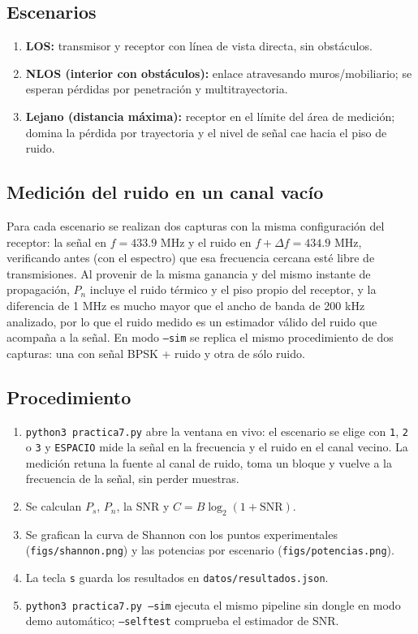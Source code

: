 \documentclass[11pt,a4paper]{article}
\begin{document}
\subsection{Escenarios}

\begin{enumerate}
  \item \textbf{LOS:} transmisor y receptor con línea de vista directa, sin obstáculos.
  \item \textbf{NLOS (interior con obstáculos):} enlace atravesando muros/mobiliario; se esperan pérdidas por penetración y multitrayectoria.
  \item \textbf{Lejano (distancia máxima):} receptor en el límite del área de medición; domina la pérdida por trayectoria y el nivel de señal cae hacia el piso de ruido.
\end{enumerate}

\subsection{Medición del ruido en un canal vacío}

Para cada escenario se realizan dos capturas con la misma configuración del receptor: la señal en $f=433.9$ MHz y el ruido en $f + \Delta f = 434.9$ MHz, verificando antes (con el espectro) que esa frecuencia cercana esté libre de transmisiones. Al provenir de la misma ganancia y del mismo instante de propagación, $P_n$ incluye el ruido térmico y el piso propio del receptor, y la diferencia de 1 MHz es mucho mayor que el ancho de banda de 200 kHz analizado, por lo que el ruido medido es un estimador válido del ruido que acompaña a la señal. En modo \texttt{--sim} se replica el mismo procedimiento de dos capturas: una con señal BPSK + ruido y otra de sólo ruido.

\subsection{Procedimiento}

\begin{enumerate}
  \item \texttt{python3 practica7.py} abre la ventana en vivo: el escenario se elige con \texttt{1}, \texttt{2} o \texttt{3} y \texttt{ESPACIO} mide la señal en la frecuencia y el ruido en el canal vecino. La medición retuna la fuente al canal de ruido, toma un bloque y vuelve a la frecuencia de la señal, sin perder muestras.
  \item Se calculan $P_s$, $P_n$, la SNR y $C = B\log_2(1+\mathrm{SNR})$.
  \item Se grafican la curva de Shannon con los puntos experimentales (\texttt{figs/shannon.png}) y las potencias por escenario (\texttt{figs/potencias.png}).
  \item La tecla \texttt{s} guarda los resultados en \texttt{datos/resultados.json}.
  \item \texttt{python3 practica7.py --sim} ejecuta el mismo pipeline sin dongle en modo demo automático; \texttt{--selftest} comprueba el estimador de SNR.
\end{enumerate}
\end{document}
